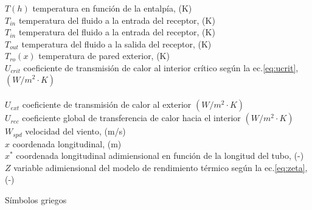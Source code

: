 \begin{tabbing}
$T(h)$ \> temperatura en función de la entalpía, (K) \\
$T_{in}$ \> temperatura del fluido a la entrada del receptor, (K) \\
$T_{in}$ \>  temperatura del fluido a la entrada del receptor, (K) \\
$T_{out}$ \> temperatura del fluido a la salida del receptor, (K) \\
$T_{ro}(x)$ \> temperatura de pared exterior, (K) \\
$U_{crit}$ \>  coeficiente de transmisión de calor al interior crítico según la ec.\eqref{eq:ucrit}, $(W/m^{2}\cdot K)$  \\ \\
$U_{ext}$ \> coeficiente de transmisión de calor al exterior $(W/m^{2}\cdot K)$  \\
$U_{rec}$  \> coeficiente global de transferencia de calor hacia el interior $(W/m^{2}\cdot K)$  \\
$W_{spd}$ \> velocidad del viento, (m/s) \\
$x$ \> coordenada longitudinal, (m) \\
$x^*$ \> coordenada longitudinal adimiensional en función de la longitud del tubo, (-) \\
$Z$ \> variable adimiensional del modelo de rendimiento térmico según la ec.\eqref{eq:zeta}, (-) \\
\end{tabbing}


Símbolos griegos

